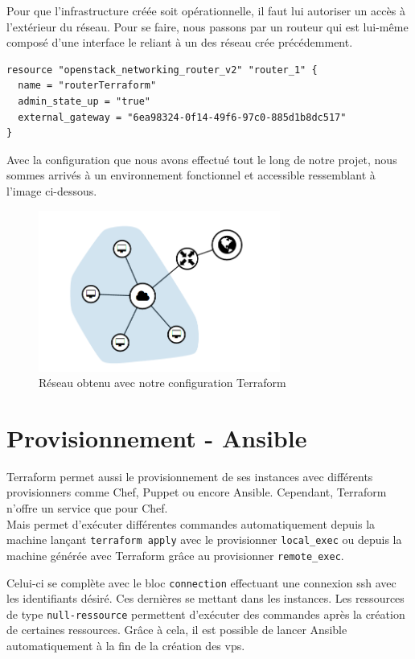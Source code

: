 \documentclass[]{article}
\begin{document}
Pour que l'infrastructure créée soit opérationnelle, il faut lui
autoriser un accès à l'extérieur du réseau. Pour se faire, nous passons
par un routeur qui est lui-même composé d'une interface le reliant à un
des réseau crée précédemment.
\begin{verbatim}
resource "openstack_networking_router_v2" "router_1" {
  name = "routerTerraform"
  admin_state_up = "true"
  external_gateway = "6ea98324-0f14-49f6-97c0-885d1b8dc517"
}
\end{verbatim}

\vspace{1cm}
Avec la configuration que nous avons effectué tout le long de notre projet, nous sommes arrivés à un environnement fonctionnel et accessible ressemblant à l'image ci-dessous.
\begin{figure}
\centering
\includegraphics[height=200px]{Images/reseau.png}
\caption{Réseau obtenu avec notre configuration Terraform}
\end{figure}

\newpage
\section{Provisionnement - Ansible}\label{provisionnement}

Terraform permet aussi le provisionnement de ses instances avec
différents provisionners comme Chef, Puppet ou encore Ansible.
Cependant, Terraform n'offre un service que pour Chef.\\
 Mais permet d'exécuter différentes commandes automatiquement depuis la machine
lançant \texttt{terraform\ apply} avec le provisionner
\texttt{local\_exec} ou depuis la machine générée avec Terraform grâce
au provisionner \texttt{remote\_exec}. 

Celui-ci se complète avec le bloc
\texttt{connection} effectuant une connexion ssh avec les identifiants
désiré. Ces dernières se mettant dans les instances. Les ressources de
type \texttt{null-ressource} permettent d'exécuter des commandes après
la création de certaines ressources. Grâce à cela, il est possible de
lancer Ansible automatiquement à la fin de la création des vps.
\end{document}
